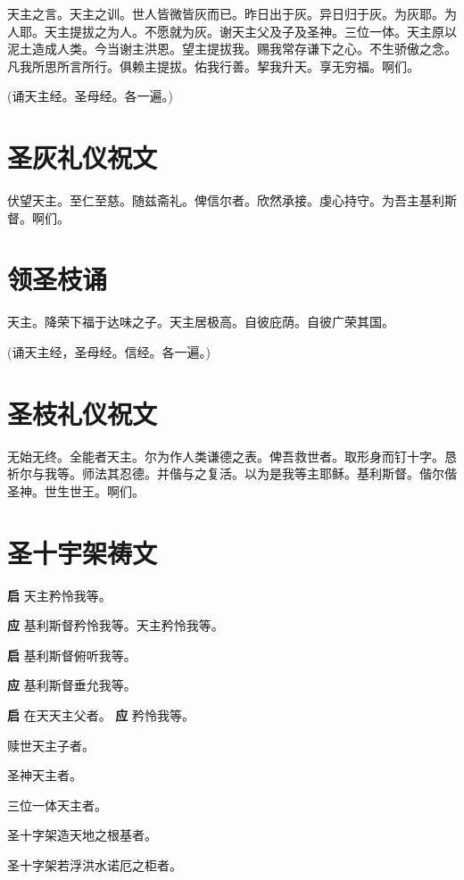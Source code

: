\documentclass[UTF8,17pt]{ctexart}
\begin{document}
天主之⾔。天主之训。世⼈皆微皆灰⽽已。昨⽇出于灰。异⽇归于灰。为灰耶。为⼈耶。天主提拔之为⼈。不愿就为灰。谢天主⽗及⼦及圣神。三位⼀体。天主原以泥⼟造成⼈类。今当谢主洪恩。望主提拔我。赐我常存谦下之⼼。不⽣骄傲之念。凡我所思所⾔所⾏。俱赖主提拔。佑我⾏善。挈我升天。享⽆穷福。啊们。

(诵天主经。圣母经。各⼀遍。)

\section{圣灰礼仪祝⽂}

伏望天主。⾄仁⾄慈。随兹斋礼。俾信尔者。欣然承接。虔⼼持守。为吾主基利斯督。啊们。

\section{领圣枝诵}

天主。降荣下福于达味之⼦。天主居极⾼。⾃彼庇荫。⾃彼⼴荣其国。

(诵天主经，圣母经。信经。各⼀遍。)

\section{圣枝礼仪祝⽂}

⽆始⽆终。全能者天主。尔为作⼈类谦德之表。俾吾救世者。取形⾝⽽钉⼗字。恳祈尔与我等。师法其忍德。并偕与之复活。以为是我等主耶稣。基利斯督。偕尔偕圣神。世⽣世王。啊们。

\section{圣⼗宇架祷文}

\textbf{启} \quad 天主矜怜我等。

\textbf{应} \quad 基利斯督矜怜我等。天主矜怜我等。

\textbf{启} \quad 基利斯督俯听我等。

\textbf{应} \quad 基利斯督垂允我等。

\textbf{启} \quad 在天天主⽗者。 \hfill \textbf{应} \quad 矜怜我等。

 赎世天主⼦者。

 圣神天主者。

 三位⼀体天主者。

 圣⼗字架造天地之根基者。

 圣⼗字架若浮洪⽔诺厄之柜者。
\end{document}
